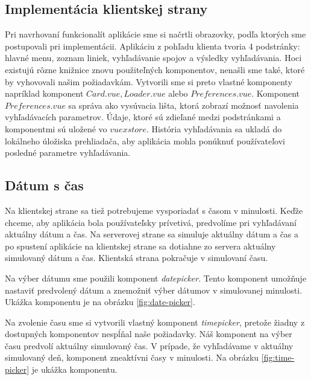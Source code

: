 \subsection{Implementácia klientskej strany} 
Pri navrhovaní funkcionalít aplikácie sme si načrtli obrazovky, podľa ktorých sme postupovali pri implementácii. 
Aplikáciu z pohľadu klienta tvoria 4 podstránky: hlavné menu, zoznam liniek, vyhľadávanie spojov a výsledky vyhľadávania. Hoci existujú rôzne knižnice znovu použiteľných komponentov, nenašli sme také, ktoré by vyhovovali našim požiadavkám. Vytvorili sme si preto vlastné komponenty napríklad komponent $Card.vue, Loader.vue$ alebo $Preferences.vue$. Komponent $Preferences.vue$ sa správa ako vysúvacia lišta, ktorá zobrazí možnosť navolenia vyhľadávacích parametrov. Údaje, ktoré sú zdieľané medzi podstránkami a komponentmi sú uložené vo $vuex store$. História vyhľadávania sa ukladá do lokálneho úložiska prehliadača, aby aplikácia mohla ponúknuť používateľovi posledné parametre vyhľadávania.


\subsection{Dátum s čas}
Na klientskej strane sa tiež potrebujeme vysporiadať s časom v minulosti. Keďže chceme, aby aplikácia bola používateľsky prívetivá, predvolíme pri vyhľadávaní aktuálny dátum a čas. Na serverovej strane sa simuluje aktuálny dátum a čas a po spustení aplikácie na klientskej strane sa dotiahne zo servera aktuálny simulovaný dátum a čas. Klientská strana pokračuje v simulovaní času. 

Na výber dátumu sme použili komponent \textit{datepicker}. Tento komponent umožňuje nastaviť predvolený dátum a znemožniť výber dátumov v simulovanej minulosti. Ukážka komponentu je na obrázku \ref{fig:date-picker}.

Na zvolenie času sme si vytvorili vlastný komponent \textit{timepicker}, pretože žiadny z dostupných komponentov nespĺňal naše požiadavky. Náš komponent na výber času predvolí aktuálny simulovaný čas. V prípade, že vyhľadávame v aktuálny simulovaný deň, komponent zneaktívni časy v minulosti. Na obrázku \ref{fig:time-picker} je ukážka komponentu.

